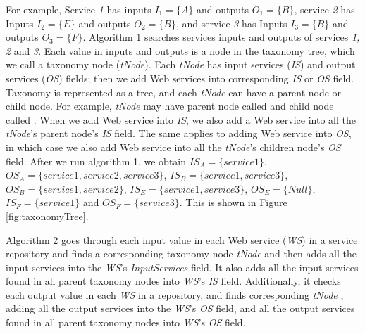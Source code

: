 For example, Service \emph{1} has inputs $I_1 = \{A\}$ and outputs $O_1 = \{B\}$, service \emph{2} has Inputs $I_2 = \{E\}$  and outputs $O_2 = \{B\}$, and service \emph{3} has Inputs $I_3 = \{B\}$  and outputs $O_3 = \{F\}$. Algorithm 1 searches services inputs and outputs of services \emph{1, 2} and \emph{3}. Each value in inputs and outputs is a node in the taxonomy tree, which we call a taxonomy node (\emph{tNode}). Each \emph{tNode} has input services (\emph{IS}) and output services (\emph{OS}) fields; then we add Web services into corresponding \emph{IS} or \emph{OS} field. Taxonomy is represented as a tree, and each \emph{tNode} can have a parent node or child node. For example,  \emph{tNode} may have parent node called  and child node called . When we add Web service into \emph{IS}, we also add a Web service into all the \emph{tNode}'s parent node's \emph{IS} field. The same applies to adding Web service into \emph{OS}, in which case we also add Web service into all the \emph{tNode}'s children node's \emph{OS} field. After we run algorithm 1, we obtain $IS_A = \{service 1\}$, $OS_A = \{service 1, service 2, service 3\}$, $IS_B = \{service 1, service 3\}$, $OS_B = \{service 1, service 2\}$, $IS_E = \{service 1, service 3\}$, $OS_E = \{Null\}$, $IS_F = \{service 1\}$ and $OS_F = \{service 3\}$. This is shown in Figure \ref{fig:taxonomyTree}. \par

Algorithm 2 goes through each input value in each Web service (\emph{WS}) in a service repository and finds a corresponding taxonomy node \emph{tNode} and then adds all the input services into the \emph{WS}'s \emph{InputServices} field. It also adds all the input services found in all parent taxonomy nodes into \emph{WS}'s \emph{IS} field. Additionally, it checks each output value in each \emph{WS} in a repository, and finds corresponding \emph{tNode} , adding all the output services into the \emph{WS}'s \emph{OS} field, and all the output services found in all parent taxonomy nodes into \emph{WS}'s \emph{OS} field.

